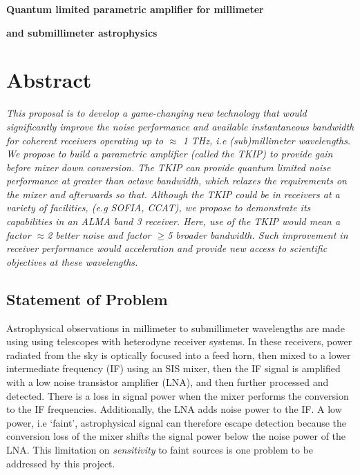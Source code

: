 






\centerline{\textbf{Quantum limited parametric amplifier for millimeter}}
\centerline{\textbf{and submillimeter astrophysics}}
\section*{Abstract}
\emph{
This proposal is to develop a game-changing new technology that would significantly improve the noise performance and available instantaneous bandwidth for coherent receivers operating up to $\approx$ 1 THz, i.e (sub)millimeter wavelengths. We propose to build a parametric amplifier (called the TKIP) to provide gain before mixer down conversion. The TKIP can provide quantum limited noise performance at greater than octave bandwidth, which relaxes the requirements on the mixer and afterwards so that. Although the TKIP could be in receivers at a variety of facilities, (e.g SOFIA, CCAT), we propose to demonstrate its capabilities in an ALMA band 3 receiver. Here, use of the TKIP would mean a  factor $\approx$2 better noise and factor $\ge$5  broader bandwidth. Such improvement in receiver performance would acceleration and provide new access to scientific objectives at these wavelengths.}

\subsection*{Statement of Problem}
Astrophysical observations in millimeter to submillimeter wavelengths are made using using telescopes with heterodyne receiver systems. In these receivers, power radiated from the sky is optically focused into a feed horn, then mixed to a lower intermediate frequency (IF) using an SIS mixer, then the IF signal is amplified with a low noise transistor amplifier (LNA), and then further processed and detected. There is a loss in signal power when the mixer performs the conversion to the IF frequencies. Additionally, the LNA adds noise power to the IF. A low power, i.e `faint', astrophysical signal can therefore escape detection because the conversion loss of the mixer shifts the signal power below the noise power of the LNA. This limitation on \emph{sensitivity} to faint sources is one problem to be addressed by this project.

